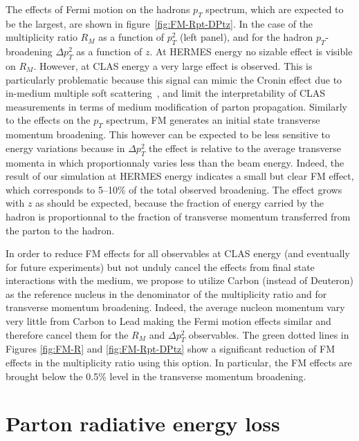 The effects of Fermi motion on the hadrons $p_T$ spectrum, which are expected to be the largest, are shown in figure~\ref{fig:FM-Rpt-DPtz}. In the case of the multiplicity ratio $R_M$ as a function of $p_T^2$ (left panel), and for the 
hadron $p_T$-broadening $\Delta p_T^2$ as a function of $z$.
At HERMES energy no sizable effect is visible on $R_M$. However, at CLAS energy a very large effect is observed. This is particularly problematic because this signal can mimic the Cronin effect due to in-medium multiple soft scattering~\cite{Kopeliovich:2003py}, and limit the interpretability of CLAS measurements in terms of medium modification of parton propagation.
Similarly to the effects on the $p_T$ spectrum, FM generates an initial state transverse momentum broadening. This however can be expected to be less sensitive to energy variations because in $\Delta p_T^2$ the effect is relative to the average transverse momenta in which proportionnaly varies less than the beam energy.
Indeed, the result of our simulation at HERMES energy indicates a small but clear FM effect, which corresponds to 5--10\% of the total observed broadening. The effect grows with $z$ as should be expected, because the fraction of energy carried by the hadron is proportionnal to the fraction of transverse momentum transferred from the parton to the hadron. 

In order to reduce FM effects for all observables at CLAS energy (and eventually for future experiments) but not unduly cancel the effects from final state interactions with the medium, we propose to utilize Carbon (instead of Deuteron) as the reference nucleus in the denominator of the multiplicity ratio and for transverse momentum broadening. Indeed, the average nucleon momentum vary very little from Carbon to Lead \cite{CiofidegliAtti:1995qe} making the Fermi motion effects similar and therefore cancel them for the $R_M$ and $\Delta p_T^2$ observables. The green dotted lines in Figures \ref{fig:FM-R} and \ref{fig:FM-Rpt-DPtz} show a significant reduction of FM effects in the multiplicity ratio using this option. In particular, the FM effects are brought below the 0.5\% level in the transverse momentum broadening.


\section{Parton radiative energy loss}
\label{sec:qweights}

